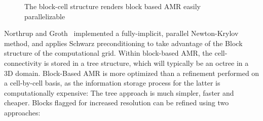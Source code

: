 %
\begin{figure}[t!]
\centering
\caption{The block-cell structure renders block based AMR easily parallelizable \cite{Northrup:2013}}  
\label{fig:moreAMR}
\end{figure}

Northrup and Groth~\cite{Northrup:2005b} implemented a fully-implicit, parallel Newton-Krylov method, and applies Schwarz preconditioning to take advantage of the Block structure of the computational grid.
Within block-based AMR, the cell-connectivity is stored in a tree structure, which will typically be an octree in a 3D domain. Block-Based AMR is more optimized than a refinement performed on a cell-by-cell basis, as the information storage process for the latter is computationally expensive: The tree approach is much simpler, faster and cheaper. Blocks flagged for increased resolution can be refined using two approaches: \par

